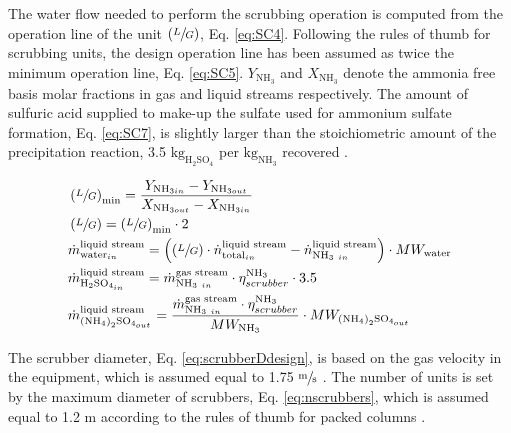 \begin{refsection}[referencesApD]
The water flow needed to perform the scrubbing operation is computed from the operation line of the unit $\left(\sfrac{L}{G}\right)$, Eq. \ref{eq:SC4}. Following the rules of thumb for scrubbing units, the design operation line has been assumed as twice the minimum operation line, Eq. \ref{eq:SC5}. $Y_{\text{NH}_3}$ and $X_{\text{NH}_3}$ denote the ammonia free basis molar fractions in gas and liquid streams respectively. The amount of sulfuric acid supplied to make-up the sulfate used for ammonium sulfate formation, Eq. \ref{eq:SC7}, is slightly larger than the stoichiometric amount of the precipitation reaction, 3.5 $\text{kg}_{\text{H}_2 \text{SO}_4}$ per ${\text{kg}_{\text{NH}_3}}$ recovered \citep{bolzonella2018nutr}.

\begin{align}
& \left(\sfrac{L}{G}\right)_{\text{min}}= \frac{Y_{\text{NH}_{3 in}} - Y_{\text{NH}_{3 out}}}{X_{\text{NH}_{3 out}} - X_{\text{NH}_{3 in}}} \label{eq:SC4} 
\\
& \left(\sfrac{L}{G}\right)= \left(\sfrac{L}{G}\right)_{\text{min}} \cdot 2 \label{eq:SC5} 
\\
& \dot{m}_{\text{water}_{in}}^{\text{liquid stream}} = \left(\left(\sfrac{L}{G}\right) \cdot \dot{n}_{\text{total}_{in}}^{\text{liquid stream}} - \dot{n}_{\text{NH}_{3 \ in}}^{\text{liquid stream}}\right) \cdot MW_{\text{water}} \label{eq:SC6} 
\\
& \dot{m}_{\text{H}_2 \text{SO}_{4_{in}}}^{\text{liquid stream}} = \dot{m}_{\text{NH}_{3 \ in}}^{\text{gas stream}} \cdot \eta_{scrubber}^{\text{NH}_3} \cdot 3.5 \label{eq:SC7} 
\\
& \dot{m}_{\left(\text{NH}_4\right)_2 \text{SO}_{4_{out}}}^{\text{liquid stream}} = \frac{\dot{m}_{\text{NH}_{3 \ in}}^{\text{gas stream}} \cdot \eta_{scrubber}^{\text{NH}_3}}{MW_{\text{NH}_3}} \cdot MW_{\left(\text{NH}_4\right)_2 \text{SO}_{4_{out}}} \label{eq:SC8} 
\end{align}

The scrubber diameter, Eq. \ref{eq:scrubberDdesign}, is based on the gas velocity in the equipment, which is assumed equal to 1.75 $\sfrac{\text{m}}{\text{s}}$ \citep{melse2005air}. The number of units is set by the maximum diameter of scrubbers, Eq. \ref{eq:nscrubbers}, which is assumed equal to 1.2 m according to the rules of thumb for packed columns \citep{Branan2005}.


\end{refsection}
